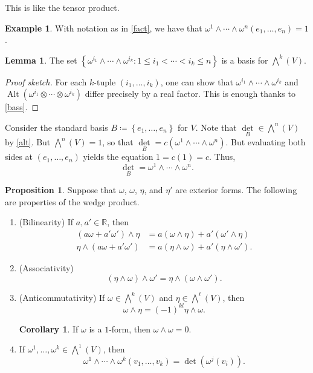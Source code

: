 \documentclass[10pt,letterpaper,cm]{nupset}
\theoremstyle{definition}
\newtheorem{exmp}[definition]{Example}
\theoremstyle{theorem}
\newtheorem{lemma}[definition]{Lemma}
\newtheorem{prop}[definition]{Proposition}
\newtheorem{corollary}[definition]{Corollary}
\theoremstyle{remark}
\newcommand{\R}{\mathbb R}
\newcommand{\1}{\mathbf{1}}
\newcommand{\0}{\vec 0}
\DeclareMathOperator{\Alt}{Alt}
\begin{document}
This is like the tensor product. 

\begin{exmp}
With notation as in \cref{fact}, we have that $\omega^1 \wedge \cdots \wedge \omega^n(e_1, \ldots, e_n) =1$.
\end{exmp}

\begin{lemma}
The set $\left\{\omega^{i_1} \wedge \cdots \wedge \omega^{i_k}  : 1 \leq i_1 < \cdots < i_k \leq n\right\}$ is a basis for $\bigwedge^k(V)$.
\end{lemma}
\begin{proof}[Proof sketch]
For each $k$-tuple $\left(i_1, \ldots, i_k\right)$, one can show that $\omega^{i_1} \wedge \cdots \wedge \omega^{i_k}$ and $\Alt(\omega^{i_1} \otimes \cdots \otimes \omega^{i_k} )$ differ precisely by a real factor. This is enough thanks to \cref{bass}.
\end{proof}

\smallskip

Consider the standard basis $B \coloneqq   \left\{e_1, \ldots, e_n\right\}$ for $V$. Note that $\underset{B}{\det} \in \bigwedge^n(V)$ by \cref{alt}.
But $\bigwedge^n(V) = 1$, so that $\underset{B}{\det} = c(\omega^1 \wedge \cdots \wedge \omega^n)$. But evaluating both sides at $\left(e_1, \ldots, e_n\right)$ yields the equation $1 = c(1) = c$. Thus, $$\underset{B}{\det} = \omega^1 \wedge \cdots \wedge \omega^n.$$

\smallskip

\begin{prop}\label{stuff} Suppose that $\omega$, $\omega$, $\eta$, and $\eta'$ are exterior forms. The following are properties of the wedge product.
\begin{enumerate}[label=(\arabic*)]
\item{(Bilinearity)} If $a, a' \in \R$, then 
\begin{align*}
(a\omega + a'\omega ')\wedge \eta &= a(\omega \wedge \eta) + a'(\omega' \wedge \eta)   \\   \eta \wedge (a\omega + a'\omega ') &= a(\eta \wedge \omega) + a'(\eta \wedge \omega' ). 
\end{align*}
\item{(Associativity)} $$\left(\eta \wedge \omega\right) \wedge \omega' =    \eta \wedge \left(\omega \wedge \omega'\right) .$$
\item{(Anticommutativity)} If $\omega \in \bigwedge^k(V)$ and $\eta \in \bigwedge^{\ell}(V)$, then $$\omega \wedge \eta = \left({-1}\right)^{kl}\eta \wedge \omega.   $$
\begin{corollary}
If $\omega$ is a $1$-form, then $\omega \wedge \omega = 0$.
\end{corollary}
\item If $\omega^1, \ldots, \omega^k \in \bigwedge^1(V)$, then $$ \omega^1 \wedge \cdots \wedge \omega^k(v_1, \ldots, v_k) =\det(\omega^j(v_i)). $$ 
\end{enumerate}
\end{prop}
\end{document}
